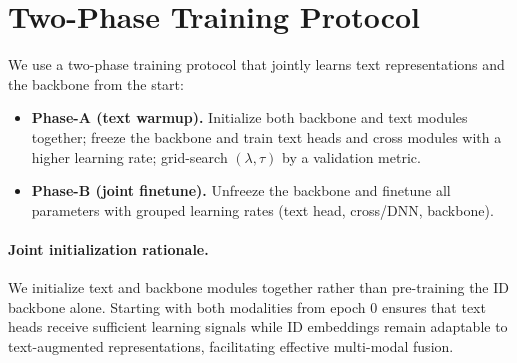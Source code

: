 \section{Two-Phase Training Protocol}
We use a two-phase training protocol that jointly learns text
representations and the backbone from the start:
\begin{itemize}[leftmargin=*,itemsep=2pt]
  \item \textbf{Phase-A (text warmup).}
    Initialize both backbone and text modules together;
    freeze the backbone and train text heads and cross modules
    with a higher learning rate;
    grid-search $(\lambda,\tau)$ by a validation metric.
  \item \textbf{Phase-B (joint finetune).}
    Unfreeze the backbone and finetune all parameters
    with grouped learning rates (text head, cross/DNN, backbone).
\end{itemize}
\paragraph{Joint initialization rationale.}
We initialize text and backbone modules together rather than
pre-training the ID backbone alone. Starting with both modalities
from epoch 0 ensures that text heads receive sufficient learning
signals while ID embeddings remain adaptable to text-augmented
representations, facilitating effective multi-modal fusion.
